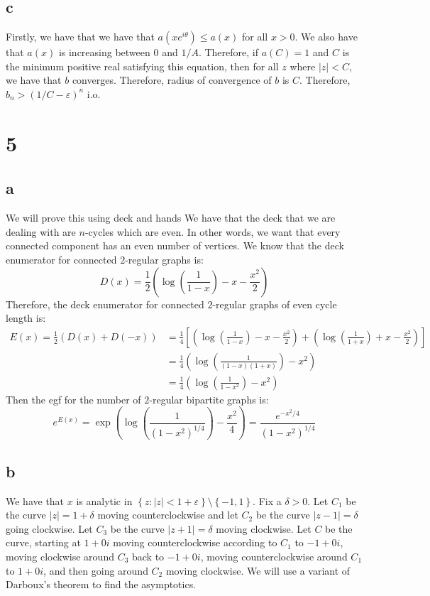 \documentclass[]{article}
\begin{document}
\subsection{c}
Firstly, we have that we have that $a(x e^{i\theta}) \leq a(x)$ for all $x > 0$. We also have that $a(x)$ is increasing between $0$ and $1/A$. Therefore, if $a(C) = 1$ and $C$ is the minimum positive real satisfying this equation, then for all $z$ where $|z| < C$, we have that $b$ converges. Therefore, radius of convergence of $b$ is $C$. Therefore, $b_n > \left(1/C - \varepsilon \right)^n$ i.o. 

\section{5}

\subsection{a}
We will prove this using deck and hands
We have that the deck that we are dealing with are $n$-cycles which are even. In other words, we want that every connected component has an even number of vertices. We know that the deck enumerator for connected $2$-regular graphs is:
\begin{equation}
	D(x) = \frac{1}{2}\left(\log\left(\frac{1}{1 - x}\right) - x - \frac{x^2}{2}\right)
\end{equation}
Therefore, the deck enumerator for connected $2$-regular graphs of even cycle length is:
\begin{align}
	E(x) = \frac{1}{2} \left(D(x) + D(-x)\right) &= \frac{1}{4} \left[ \left(\log\left(\frac{1}{1 - x}\right) - x - \frac{x^2}{2}\right) + \left(\log\left(\frac{1}{1 + x}\right) + x - \frac{x^2}{2}\right) \right]\\
	&=\frac{1}{4} \left(\log\left(\frac{1}{(1 - x)(1 + x)}\right) - x^2\right) \\
	&=\frac{1}{4} \left(\log\left(\frac{1}{1 - x^2}\right)- x^2\right) 
\end{align}
Then the egf for the number of $2$-regular bipartite graphs is:
\begin{equation}
	e^{E(x)} = \exp\left(\log\left(\frac{1}{(1 - x^2)^{1/4}}\right)- \frac{x^2}{4}\right)  = \frac{e^{-x^2/4}}{(1 - x^2)^{1/4}}
\end{equation}

\subsection{b}
We have that $x$ is analytic in $\left\{ z: |z| < 1 + \varepsilon \right\} \setminus \left\{ -1, 1 \right\}$. Fix a $\delta > 0$. Let $C_1$ be the curve $|z| = 1 + \delta$ moving counterclockwise  and let $C_2$ be the curve $|z - 1| = \delta$ going clockwise. Let $C_3$ be the curve $|z + 1| = \delta$ moving clockwise. Let $C$ be the curve, starting at $1 + 0i$ moving counterclockwise according to $C_1$ to $-1 + 0i$, moving clockwise around $C_3$ back to $-1 + 0 i$, moving counterclockwise around $C_1$ to $1 + 0i$, and then going around $C_2$ moving clockwise. We will use a variant of Darboux's theorem to find the asymptotics.
\end{document}
